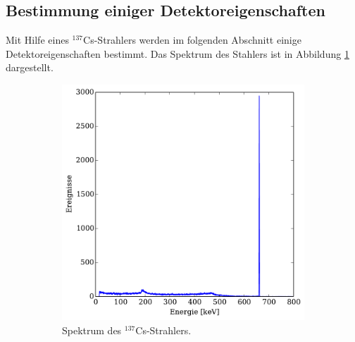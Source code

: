 \subsection{Bestimmung einiger Detektoreigenschaften} %
\label{sub:detektoreigenschaften}
Mit Hilfe eines $^{137}$Cs-Strahlers werden im folgenden Abschnitt einige Detektoreigenschaften bestimmt.
Das Spektrum des Stahlers ist in Abbildung \ref{fig:cs_spektrum} dargestellt.
\begin{figure}[htb]
    \centering
    \begin{subfigure}{0.49\linewidth}
        \centering
        \includegraphics[width=1.0\linewidth]{img/06_caesium.pdf}
        \caption{
            Spektrum des $^{137}$Cs-Strahlers.
        }
        \label{fig:cs_spektrum}
    \end{subfigure}
    \begin{subfigure}{0.49\linewidth}
        \centering

\end{subfigure}
\end{figure}

